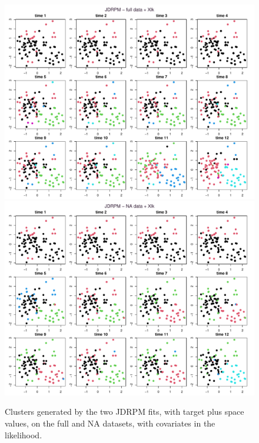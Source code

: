 \documentclass[12pt,	%
	a4paper,		%
	twoside,		%
	openright,		%
	titlepage,%
	]{book}
\theoremstyle{definition}
\begin{document}
\begin{figure}[!p]
    \centering
    \includegraphics[width=1\linewidth]{Testing/Covariates/NA lk improvement/fitJDRPM - full data + Xlk_simple_map.pdf}
    \includegraphics[width=1\linewidth]{Testing/Covariates/NA lk improvement/fitJDRPM - NA data + Xlk_simple_map.pdf}
    \caption[Clusters generated by JDRPM fits, target plus space values, full vs NA dataset, with covariates in the likelihood]{Clusters generated by the two JDRPM fits, with target plus space values, on the full and NA datasets, with covariates in the likelihood.}
    \label{fig:xlk clusters}
\end{figure}
\end{document}
